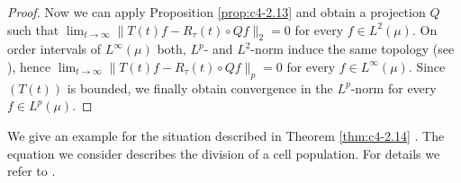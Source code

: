 \begin{proof}
Now we can apply Proposition \ref{prop:c4-2.13} and obtain a projection $Q$ such that $\lim_{t \to \infty}\|T(t)f - R_{\tau}(t) \circ Qf\|_{2} = 0$ for every $f \in L^{2}(\mu)$.
On order intervals of $L^{\infty}(\mu)$ both, $L^{p}$- and $L^{2}$-norm induce the same topology (see
%
\citet[V.8.3]{schaefer:1974}), hence $\lim_{t \to \infty} \|T(t)f - R_{\tau}(t) \circ Qf\|_{p} = 0$ for every $f \in L^{\infty}(\mu)$.
Since $(T(t))$ is bounded, we finally obtain convergence in the $L^{p}$-norm for every $f \in L^{p}(\mu)$.
\end{proof}


We give an example for the situation described in Theorem \ref{thm:c4-2.14} .
The equation we consider describes the division of a cell population.
For details we refer to \citet{diekmannetal:1984}.


